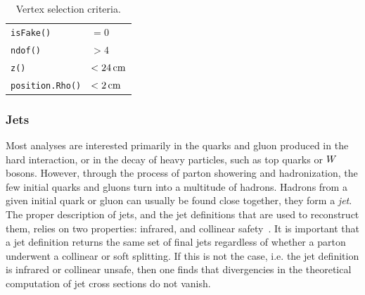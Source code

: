 \begin{table}[htdp]
\caption{Vertex selection criteria. \label{tab:object_vertex}}
\begin{center}
\begin{tabular}{l l}
\toprule
\texttt{\small isFake()} & $= 0$ \\
\texttt{\small ndof()} & $> 4$ \\
\texttt{\small z()} & $< 24\,\text{cm}$ \\
\texttt{\small position.Rho()} & $< 2\,\text{cm}$ \\
\bottomrule
\end{tabular}
\end{center}
\end{table}


\subsubsection{Jets \label{sec:object_jets}}

Most analyses are interested primarily in the quarks and gluon produced in the hard interaction, or
in the decay of heavy particles, such as top quarks or $W$ bosons. 
However, through the process of parton showering and hadronization, the few initial quarks and
gluons turn into a multitude of hadrons. 
Hadrons from a given initial quark or gluon can usually be found close together, they form a
\textit{jet}. The proper description of jets, and the jet definitions that are used to reconstruct
them, relies on two properties: infrared, and collinear safety~\cite{Salam:2009jx}.
It is important that a jet definition returns the same set of final jets regardless of whether a
parton underwent a collinear or soft splitting. If this is not the case, i.e. the jet definition is
infrared or collinear unsafe, then one finds that divergencies in the theoretical computation of
jet cross sections do not vanish. 

